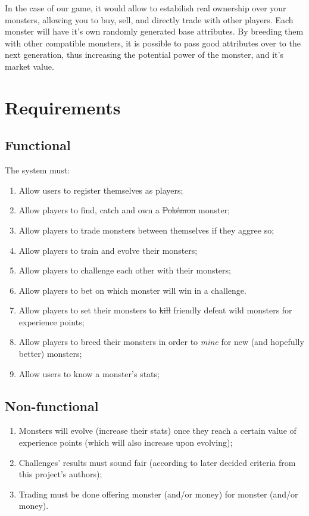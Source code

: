 \documentclass{article}
\begin{document}
    In the case of our game, it would allow to estabilish real ownership over
    your monsters, allowing you to buy, sell, and directly trade with other
    players.  Each monster will have it's own randomly generated base
    attributes. By breeding them with other compatible monsters, it is possible
    to pass good attributes over to the next generation, thus increasing the
    potential power of the monster, and it's market value.

    \section{Requirements}

    \subsection{Functional}

    The system must:

    \begin{enumerate}
        \item Allow users to register themselves as players;
        \item Allow players to find, catch and own a \st{Pokémon} monster;
        \item Allow players to trade monsters between themselves if they aggree
              so;
        \item Allow players to train and evolve their monsters;
        \item Allow players to challenge each other with their monsters;
        \item Allow players to bet on which monster will win in a challenge.
        \item Allow players to set their monsters to \st{kill} friendly defeat
              wild monsters for experience points;
        \item Allow players to breed their monsters in order to \textit{mine}
              for new (and hopefully better) monsters;
        \item Allow users to know a monster's stats;
    \end{enumerate}

    \subsection{Non-functional}

    \begin{enumerate}
        \item Monsters will evolve (increase their stats) once they reach a
              certain value of experience points (which will also increase upon
              evolving);
        \item Challenges' results must sound fair (according to later decided
              criteria from this project's authors);
        \item Trading must be done offering monster (and/or money) for monster
              (and/or money).
    \end{enumerate}
\end{document}
